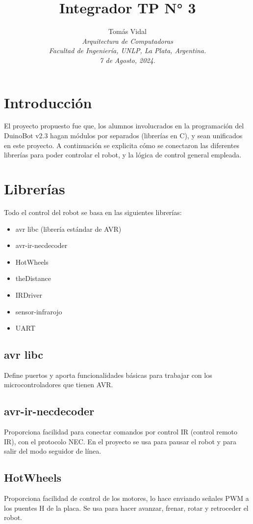 \documentclass[letterpaper, 10 pt, conference]{ieeeconf}  %
\title{\LARGE \bf Integrador TP N° 3}
\author{
  Tom\'as Vidal\\
  {\it Arquitectura de Computadoras}\\
  {\it Facultad de Ingenier\'ia, UNLP, La Plata, Argentina.}\\
  {\it 7 de Agosto, 2024.}
}                                            %
\begin{document}
\maketitle
\thispagestyle{empty}
\pagestyle{empty}

\section{Introducción}
El proyecto propuesto fue que, los alumnos involucrados en la programación del DuinoBot v2.3 hagan módulos por separados (librerías en C), y sean unificados en este proyecto. A continuación se explicita cómo se conectaron las diferentes librerías para poder controlar el robot, y la lógica de control general empleada.

\section{Librerías}
Todo el control del robot se basa en las siguientes librerías:
\begin{itemize}
  \item avr libc (librería estándar de AVR)
  \item avr-ir-necdecoder
  \item HotWheels
  \item theDistance
  \item IRDriver
  \item sensor-infrarojo
  \item UART
\end{itemize}

\subsection{avr libc}
Define puertos y aporta funcionalidades básicas para trabajar con los microcontroladores que tienen AVR.

\subsection{avr-ir-necdecoder}
Proporciona facilidad para conectar comandos por control IR (control remoto IR), con el protocolo NEC. En el proyecto se usa para pausar el robot y para salir del modo seguidor de línea.

\subsection{HotWheels}
Proporciona facilidad de control de los motores, lo hace enviando señales PWM a los puentes H de la placa. Se usa para hacer avanzar, frenar, rotar y retroceder el robot.
\end{document}
